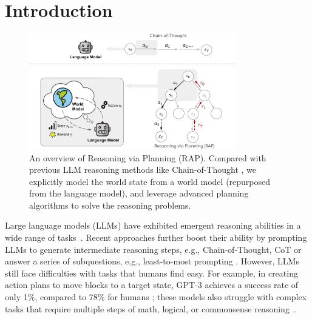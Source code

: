 \section{Introduction}

\begin{figure}[!t]
    \centering
    \includegraphics[width=0.8\textwidth]{sections/Figure-1_final.pdf}
    \vspace{-8pt}
    \caption{An overview of Reasoning via Planning (RAP). Compared with previous LLM reasoning methods like Chain-of-Thought \cite{wei2022chain}, we explicitly model the world state from a world model (repurposed from the language model), and leverage advanced planning algorithms to solve the reasoning problems.
    }
    \label{fig:1}
    \vspace{-12pt}
\end{figure}


Large language models (LLMs) have exhibited emergent reasoning abilities in a wide range of tasks~\cite{brown2020language, chowdhery2022palm, openai2023gpt4}. Recent approaches further boost their ability by prompting LLMs to generate intermediate reasoning steps, e.g., Chain-of-Thought, CoT \cite{wei2022chain} or answer a series of subquestions, e.g., least-to-most prompting \cite{zhou2022least}. However, LLMs still face difficulties with tasks that humans find easy. For example, in creating action plans to move blocks to a target state, GPT-3 \cite{brown2020language} achieves a success rate of only 1\%, compared to 78\% for humans \cite{valmeekam2022large}; these models also struggle with complex tasks that require multiple steps of math, logical, or commonsense reasoning~\cite{ huang2022towards, mialon2023augmented}.

